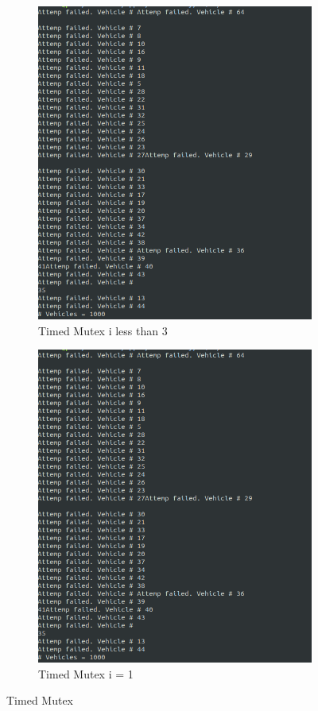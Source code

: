 \documentclass[11pt, a4paper]{article}
\begin{document}
\begin{figure}[htpb!]
\begin{subfigure}{.5\textwidth}
  \centering
  \includegraphics[width=.9\linewidth]{timed_mutex}  
  \caption{Timed Mutex i less than 3}
	\label{fig:timed_mutex}
\end{subfigure}
\begin{subfigure}{.5\textwidth}
  \centering
  \includegraphics[width=.9\linewidth]{timed_mutex}  
  \caption{Timed Mutex i = 1}
	\label{fig:timed_mutex_1}
\end{subfigure}
\caption{Timed Mutex}
\label{fig:timed_mutex}
\end{figure}
\end{document}
